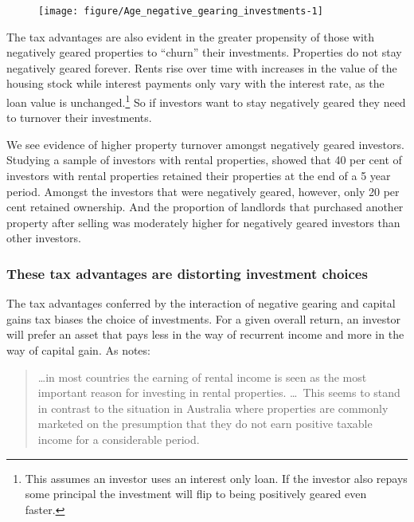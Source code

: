 \documentclass{grattan}\usepackage[]{graphicx}\usepackage[]{color}
\newcommand\gao{Grattan analysis of}
\begin{document}
\begin{figure}
\texttt{[image: figure/Age\_negative\_gearing\_investments-1]}

\source{\gao\ \textcite{ATO2013i}}
\end{figure}

The tax advantages are also evident in the greater propensity of those with negatively geared properties to ``churn'' their investments. Properties do not stay negatively geared forever. Rents rise over time with increases in the value of the housing stock while interest payments only vary with the interest rate, as the loan value is unchanged.\footnote{This assumes an investor uses an interest only loan. If the investor also repays some principal the investment will flip to being positively geared even faster.}  So if investors want to stay negatively geared they need to turnover their investments.

We see evidence of higher property turnover amongst negatively geared investors. Studying a sample of investors with rental properties, \textcite{Wood2010a} showed that 40 per cent of investors with rental properties retained their properties at the end of a 5 year period.  Amongst the investors that were negatively geared, however, only 20 per cent retained ownership.  And the proportion of landlords that purchased another property after selling was moderately higher for negatively geared investors than other investors.

\subsubsection{These tax advantages are distorting investment choices}
The tax advantages conferred by the interaction of negative gearing and capital gains tax biases the choice of investments. For a given overall return, an investor will prefer an asset that pays less in the way of recurrent income and more in the way of capital gain. As \textcite[p.~42]{RBA2014} notes:

\begin{quote}
\!\dots in most countries the earning of rental income is seen as the most important reason for investing in rental properties. \dots\ This seems to stand in contrast to the situation in Australia where properties are commonly marketed on the presumption that they do not earn positive taxable income for a considerable period.
\end{quote}
\end{document}
